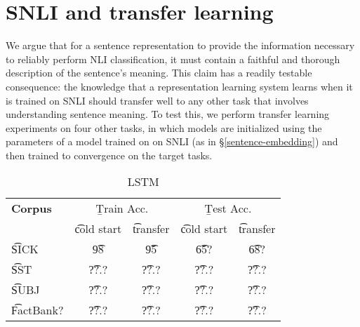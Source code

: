 \section{SNLI and transfer learning}

We argue that for a sentence representation to provide the information necessary to reliably perform NLI classification, it must contain a faithful and thorough description of the sentence's meaning. This claim has a readily testable consequence: the knowledge that a representation learning system learns when it is trained on SNLI should transfer well to any other task that involves understanding sentence meaning. To test this, we perform transfer learning experiments on four other tasks, in which models are initialized using the parameters of a model trained on  on SNLI (as in \S\ref{sentence-embedding}) and then trained to convergence on the target tasks. 

\begin{table}
\begin{center}
\begin{tabular}{l@{\hskip \colspaceL}c@{\hskip \colspaceS}c@{\hskip \colspaceS}c@{\hskip \colspaceS}c}
\hline
\textbf{Corpus} & \multicolumn{2}{c}{\b{Train Acc.}} &\multicolumn{2}{c}{ \b{Test Acc.}} \\
 & \t{cold start} & \t{transfer} & \t{cold start} & \t{transfer}  \\
\hline
\t{SICK}            & \t{98} & \t{95} & \t{65?} & \t{68?}  \\
\t{SST}          & \t{??.?} & \t{??.?} & \t{??.?} & \t{??.?} \\
\t{SUBJ}          & \t{??.?} & \t{??.?} & \t{??.?} & \t{??.?} \\
\t{FactBank?}          & \t{??.?} & \t{??.?} & \t{??.?} & \t{??.?} \\
\hline
\end{tabular}
\end{center}
\caption{
\label{tab:transferresults}
LSTM
}
\end{table}